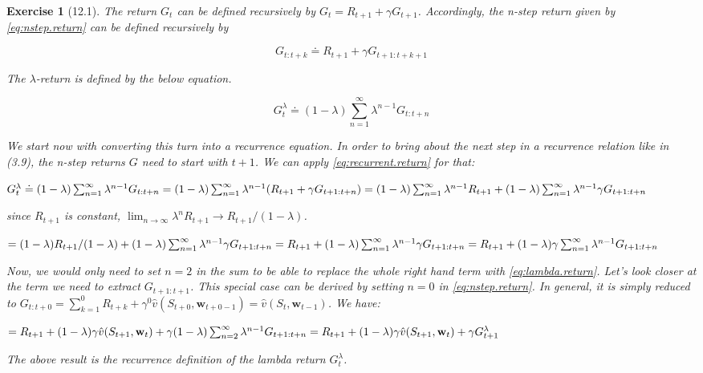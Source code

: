\documentclass[a4paper]{scrartcl}
\theoremstyle{nonumberplain}
\newtheorem{ex}{Exercise}
\begin{document}
\begin{ex}[12.1]

The return $G_t$ can be defined recursively by $G_t=R_{t+1}+\gamma G_{t+1}$. Accordingly, the n-step return given by \autoref{eq:nstep.return} can be defined recursively by 

\begin{equation}
\label{eq:recurrent.return}
G_{t:t+k}\doteq R_{t+1} + \gamma G_{t+1:t+k+1}
\end{equation}

The $\lambda$-return is defined by the below equation.

\begin{equation}
\label{eq:lambda.return}
G_t^\lambda \doteq (1-\lambda) \sum_{n=1}^{\infty} \lambda^{n-1} G_{t:t+n}
\end{equation}

We start now with converting this turn into a recurrence equation. In order to bring about the next step in a recurrence relation like in (3.9), the n-step returns $G$ need to start with $t+1$. We can apply \autoref{eq:recurrent.return} for that:

\begin{math}
G_t^\lambda \doteq (1-\lambda) \sum_{n=1}^{\infty} \lambda^{n-1} G_{t:t+n} \\
= (1-\lambda) \sum_{n=1}^{\infty} \lambda^{n-1} (R_{t+1} + \gamma G_{t+1:t+n}) \\
= (1-\lambda) \sum_{n=1}^{\infty} \lambda^{n-1} R_{t+1} + (1-\lambda) \sum_{n=1}^{\infty} \lambda^{n-1} \gamma G_{t+1:t+n}
\end{math}

since $R_{t+1}$ is constant, $\lim_{n \to \infty} \lambda^n R_{t+1} \rightarrow R_{t+1} / (1-\lambda)$.

\begin{math}
= (1-\lambda) R_{t+1} / (1-\lambda) + (1-\lambda) \sum_{n=1}^{\infty} \lambda^{n-1} \gamma G_{t+1:t+n} \\
= R_{t+1} + (1-\lambda) \sum_{n=1}^{\infty} \lambda^{n-1} \gamma G_{t+1:t+n} \\
= R_{t+1} + (1-\lambda)\gamma \sum_{n=1}^{\infty} \lambda^{n-1} G_{t+1:t+n}
\end{math}

Now, we would only need to set $n=2$ in the sum to be able to replace the whole right hand term with \autoref{eq:lambda.return}. Let's look closer at the term we need to extract  $G_{t+1:t+1}$. This special case can be derived by setting $n=0$ in \autoref{eq:nstep.return}. In general, it is simply reduced to $G_{t:t+0}=\sum_{k=1}^{0} R_{t+k} + \gamma^0 \hat{v}(S_{t+0},\mathbf{w}_{t+0-1})= \hat{v}(S_t,\mathbf{w}_{t-1})$. We have:

\begin{math}
= R_{t+1} + (1-\lambda) \gamma \hat{v}(S_{t+1},\mathbf{w}_{t}) + \gamma (1-\lambda) \sum_{n=2}^{\infty} \lambda^{n-1} G_{t+1:t+n} \\
= R_{t+1} + (1-\lambda) \gamma \hat{v}(S_{t+1},\mathbf{w}_{t}) + \gamma G_{t+1}^\lambda
\end{math}

The above result is the recurrence definition of the lambda return $G_t^\lambda$.

\end{ex}
\end{document}
